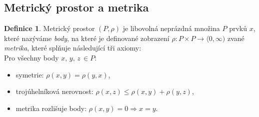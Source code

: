 \documentclass[a4]{report}
\theoremstyle{definition}
\newtheorem{definition}{Definice}[section]
\begin{document}
{\subsection{Metrický prostor a metrika}
\begin{definition}
Metrický prostor $(P,\rho)$ je libovolná neprázdná množina $P$ prvků $x$, které nazýváme \textit{body}, na které je definované zobrazení $\rho: P\times P\rightarrow \langle 0,\infty)$ zvané \textit{metrika}, které splňuje následující tři axiomy:\\
Pro všechny body $x,\,y,\,z\,\in P:$
\begin{itemize}
\item symetrie: $\rho (x,y)=\rho(y,x)$,
\item trojúhelníková nerovnost: $\rho(x,z)\leq\rho(x,y)+\rho(y,z)$,
\item metrika rozlišuje body: $\rho(x,y)=0 \Rightarrow x=y$. 
\end{itemize}
\end{definition}
}
\end{document}
